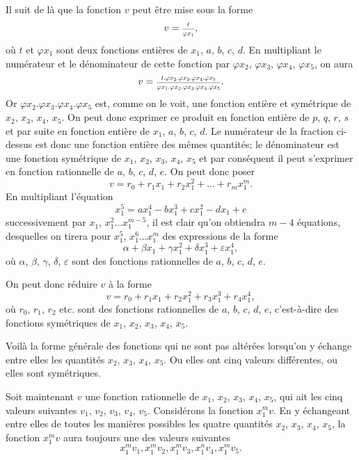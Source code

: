 \documentclass[oneside, 12 pt, leqno]{memoir}
\let\oldfrac\frac
\def\frac#1#2{\mathchoice{\text{\scalebox{.83}{${\oldfrac{#1}{#2}}$}}}{\text{\scalebox{.83}{${\displaystyle\oldfrac{#1}{#2}}$}}}{\genfrac{}{}{}{2}{#1}{#2}}{\genfrac{}{}{}{3}{#1}{#2}}}
\begin{document}
Il suit de là que la fonction \(v\) peut être mise sous la forme
\[v=\frac{t}{\varphi x_1},\]
où \(t\) et \(\varphi x_1\) sont deux fonctions entières de \(x_1\), \(a\), \(b\), \(c\), \(d\). En multipliant le numérateur et le dénominateur de cette fonction par \(\varphi x_2\), \(\varphi x_3\), \(\varphi x_4\), \(\varphi x_5\),
on aura
\[ v = \frac{t . \varphi x_2 . \varphi x_3 . \varphi x_4 . \varphi x_5}{\varphi x_1 . \varphi x_2 . \varphi x_3 . \varphi x_4 . \varphi x_5}.\]
Or \(\varphi x_2 . \varphi x_3 . \varphi x_4 . \varphi x_5\) est, comme on le voit, une fonction entière et symétrique de \(x_2\), \(x_3\), \(x_4\), \(x_5\). On peut donc exprimer ce produit en fonction entière de \(p\), \(q\), \(r\), \(s\) et par suite en fonction entière de \(x_1\), \(a\), \(b\), \(c\), \(d\). Le numérateur de la fraction ci-dessus est donc une fonction entière des mêmes quantités; le dénominateur est une fonction symétrique de \(x_1\), \(x_2\), \(x_3\), \(x_4\), \(x_5\) et par conséquent il peut s'exprimer en fonction rationnelle de \(a\), \(b\), \(c\), \(d\), \(e\). On peut donc poser
\[v=r_0+r_1 x_1+r_2 x_1^2+\dots+r_m x_1^m.\]
En multipliant l'équation
\[x_1^5=a x_1^4-b x_1^3+c x_1^2-d x_1+e\]
successivement par \(x_1\), \(x_1^2 \dots x_1^{m-5}\), il est clair qu'on obtiendra \(m-4\) équations, desquelles on tirera pour \(x_1^5\), \(x_1^6 \dots x_1^m\) des expressions de la forme
\[\alpha+\beta x_1+\gamma x_1^2+ \delta x_1^3+ \varepsilon x_1^4,\]
où \(\alpha\), \(\beta\), \(\gamma\), \(\delta\), \(\varepsilon\) sont des fonctions rationnelles de \(a\), \(b\), \(c\), \(d\), \(e\).

On peut donc réduire \(v\) à la forme
\[\tag{a}v=r_0+r_1 x_1+r_2 x_1^2+r_3 x_1^3+r_4 x_1^4,\]
où \(r_0\), \(r_1\), \(r_2\) etc. sont des fonctions rationnelles de \(a\), \(b\), \(c\), \(d\), \(e\), c'est-à-dire des fonctions symétriques de \(x_1\), \(x_2\), \(x_3\), \(x_4\), \(x_5\).

Voilà la forme générale des fonctions qui ne sont pas altérées lorsqu'on y échange entre elles les quantités \(x_2\), \(x_3\), \(x_4\), \(x_5\). Ou elles ont cinq valeurs différentes, ou elles sont symétriques.

Soit maintenant \(v\) une fonction rationnelle de \(x_1\), \(x_2\), \(x_3\), \(x_4\), \(x_5\), qui ait les cinq valeurs suivantes \(v_1\), \(v_2\), \(v_3\), \(v_4\), \(v_5\). Considérons la fonction \(x_1^m v\). En y échangeant entre elles de toutes les manières possibles les quatre quantités \(x_2\), \(x_3\), \(x_4\), \(x_5\), la fonction \(x_1^m v\) aura toujours une des valeurs suivantes
\[x_1^m v_1, x_1^m v_2, x_1^m v_3, x_1^n v_4, x_1^m v_5.\]
\end{document}
